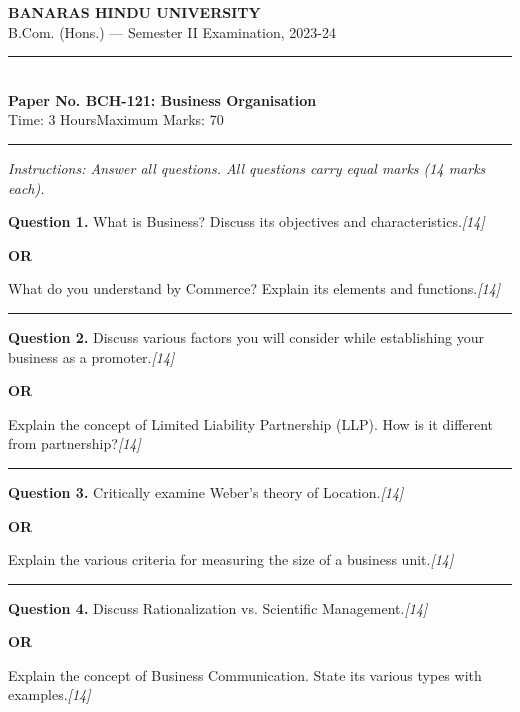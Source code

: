 \documentclass[11pt,a4paper]{article}
\newcommand{\pts}[1]{\hfill   \textit{[#1]}}
\begin{document}
\begin{center}
  {\large\bfseries BANARAS HINDU UNIVERSITY}\\[2pt]
  {\normalsize B.Com. (Hons.) --- Semester II Examination, 2023-24}\\[6pt]
  \rule{0.8\linewidth}{0.5pt}\\[6pt]
  {\large\bfseries Paper No. BCH-121: Business Organisation}\\[4pt]
  {\normalsize Time: 3 Hours\hfill Maximum Marks: 70}
\end{center}

\rule{\linewidth}{0.4pt}

\smallskip



\noindent   \textit{Instructions: Answer all questions. All questions carry equal marks (14 marks each).}

\bigskip




\noindent   \textbf{Question 1.}
What is Business? Discuss its objectives and characteristics.\pts{14}

\centerline{   \textbf{OR}}

What do you understand by Commerce? Explain its elements and functions.\pts{14}

\medskip\rule{\linewidth}{0.2pt}




\noindent   \textbf{Question 2.}
Discuss various factors you will consider while establishing your business as a promoter.\pts{14}

\centerline{   \textbf{OR}}

Explain the concept of Limited Liability Partnership (LLP). How is it different from partnership?\pts{14}

\medskip\rule{\linewidth}{0.2pt}




\noindent   \textbf{Question 3.}
Critically examine Weber's theory of Location.\pts{14}

\centerline{   \textbf{OR}}

Explain the various criteria for measuring the size of a business unit.\pts{14}

\medskip\rule{\linewidth}{0.2pt}




\noindent   \textbf{Question 4.}
Discuss Rationalization vs. Scientific Management.\pts{14}

\centerline{   \textbf{OR}}

Explain the concept of Business Communication. State its various types with examples.\pts{14}
\end{document}
